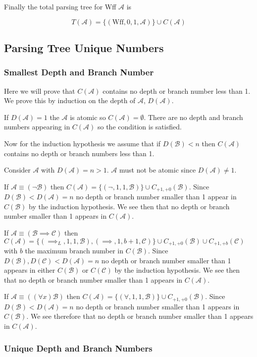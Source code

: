 \documentclass[12pt]{article}
\newcommand{\mc}[1]{\mathcal{#1}}
\begin{document}
Finally the total parsing tree for Wff $\mc{A}$ is

$$
T(\mc{A}) = \{(\text{Wff}, 0, 1, \mc{A})\} \cup C(\mc{A})
$$

\subsection{Parsing Tree Unique Numbers}

\subsubsection{Smallest Depth and Branch Number}
Here we will prove that $C(\mc{A})$ contains no depth or branch number less than 1. We prove this by induction on the depth of $\mc{A}$, $D(\mc{A})$.

If $D(\mc{A}) = 1$ the $\mc{A}$ is atomic so $C(\mc{A}) = \emptyset$. There are no depth and branch numbers appearing in $C(\mc{A})$ so the condition is satisfied.

Now for the induction hypothesis we assume that if $D(\mc{B}) < n$ then $C(\mc{A})$ contains no depth or branch numbers less than 1.

Consider $\mc{A}$ with $D(\mc{A}) = n > 1$. $\mc{A}$ must not be atomic since $D(\mc{A}) \neq 1$.

If $\mc{A} \equiv (\lnot \mc{B})$ then $C(\mc{A}) = \{(\lnot, 1, 1, \mc{B})\} \cup C_{+1, +0}(\mc{B})$. Since $D(\mc{B}) < D(\mc{A}) = n$ no depth or branch number smaller than 1 appear in $C(\mc{B})$ by the induction hypothesis. We see then that no depth or branch number smaller than 1 appears in $C(\mc{A})$.

If $\mc{A} \equiv (\mc{B} \implies \mc{C})$ then $C(\mc{A}) = \{(\implies_L, 1, 1, \mc{B}), (\implies, 1, b+1, \mc{C})\} \cup C_{+1, +0}(\mc{B}) \cup C_{+1, +b}(\mc{C})$ with $b$ the maximum branch number in $C(\mc{B})$. Since $D(\mc{B}), D(\mc{C}) < D(\mc{A}) = n$ no depth or branch number smaller than 1 appears in either $C(\mc{B})$ or $C(\mc{C})$ by the induction hypothesis. We see then that no depth or branch number smaller than 1 appears in $C(\mc{A})$.

If $\mc{A} \equiv ((\forall x)\mc{B})$ then $C(\mc{A}) = \{(\forall, 1, 1, \mc{B})\} \cup C_{+1, +0}(\mc{B})$. Since $D(\mc{B}) < D(\mc{A}) = n$ no depth or branch number smaller than 1 appears in $C(\mc{B})$. We see therefore that no depth or branch number smaller than 1 appears in $C(\mc{A})$.

\subsubsection{Unique Depth and Branch Numbers}
\end{document}
